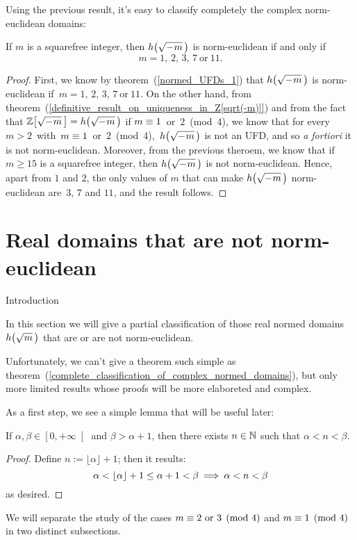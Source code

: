 Using the previous result, it's easy to classify
completely the complex norm-euclidean domains:

\begin{thm} 
\label{complete_classification_of_complex_normed_domains}
If $m$ is a squarefree integer, then $\hhm{m}$ is
norm-euclidean if and only if
$$ m = 1,\, 2,\, 3,\, 7\ \textrm{or}\ 11. $$
\end{thm}

\begin{proof}
%
First, we know by theorem~(\ref{normed_UFDs_1})
that $\hhm{m}$ is norm-euclidean if\,
$m = 1,\, 2,\, 3,\, 7\ \textrm{or}\ 11$.
On the other hand, from
theorem~(\ref{definitive_result_on_uniqueness_in_Z[sqrt(-m)]})
and from the fact that $\ZZM{m} = \hhm{m}$ if
\mbox{$m \equiv 1$ or $2$ (mod 4)}, we know that for
every\, $m > 2$\, with\, \mbox{$m \equiv 1$ or $2$
(mod 4)},\, $\hhm{m}$ is not an UFD, and so \textit{\/a fortiori}
it is not norm-euclidean.
Moreover, from the previous theroem, we know that if $m \geq 15$
is a squarefree integer, then $\hhm{m}$ is not norm-euclidean.
Hence, apart from $1$ and $2$, the only values of $m$
that can make $\hhm{m}$ norm-euclidean are\, $3,\,7$
and $11$, and the result follows.
%
\end{proof}

\section{Real domains that are not norm-euclidean}%
\label{not_norm-euclidean_real_domains}

\begin{subsection}{Introduction}

In this section we will give a partial classification
of those real normed domains $\hh{m}$ that are or are
not norm-euclidean.

Unfortunately, we can't give a theorem such simple as
theorem~(\ref{complete_classification_of_complex_normed_domains}),
but only more limited results whose proofs will be more
elaboreted and complex.

\smallskip
As a first step, we see a simple lemma that will be useful later:
\begin{lem}\label{intseplemma}
If $\alpha, \beta \in \left[0, +\infty\right[$
and $\beta > \alpha + 1$, then there exists $n \in \mathbb{N}$
such that $\alpha < n < \beta$.
\end{lem}
\begin{proof}
Define $n := \lfloor\alpha\rfloor + 1$; then it results:
$$
\alpha < \lfloor\alpha\rfloor + 1 \leq \alpha + 1 < \beta
\:\Longrightarrow\: \alpha < n < \beta
$$
as desired.
\end{proof}

We will separate the study of the cases
$m \equiv 2 \text{ or } 3 \pmod 4$ and
$m \equiv 1 \pmod 4$
in two distinct subsections.
\end{subsection}

